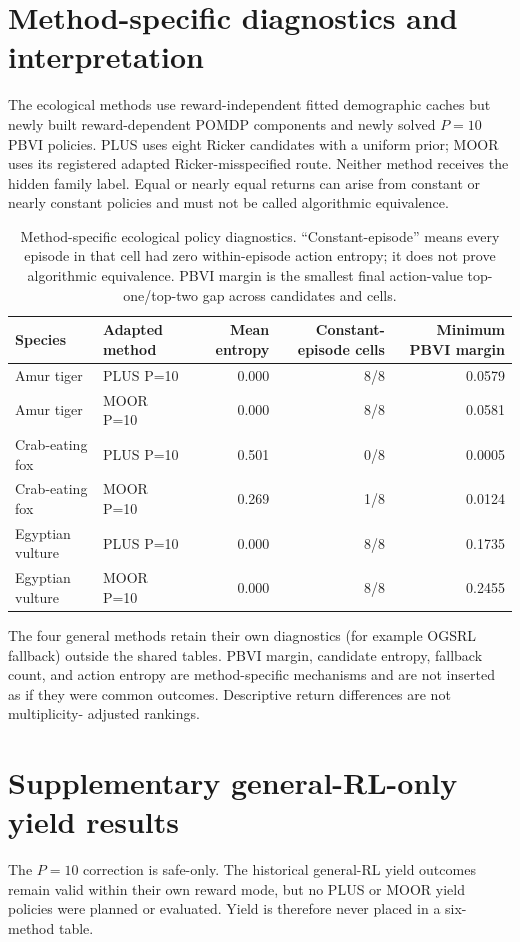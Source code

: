 \documentclass[10pt]{article}
\begin{document}
\section{Method-specific diagnostics and interpretation}
The ecological methods use reward-independent fitted demographic caches but newly
built reward-dependent POMDP components and newly solved \(P=10\) PBVI policies.
PLUS uses eight Ricker candidates with a uniform prior; MOOR uses its registered
adapted Ricker-misspecified route.  Neither method receives the hidden family
label.  Equal or nearly equal returns can arise from constant or nearly constant
policies and must not be called algorithmic equivalence.


\begin{table}[ht]
\centering\small
\begin{tabular}{@{}llrrr@{}}
\toprule
Species & Adapted method & Mean entropy & Constant-episode cells & Minimum PBVI margin \\
\midrule
Amur tiger & PLUS P=10 & 0.000 & 8/8 & 0.0579 \\
Amur tiger & MOOR P=10 & 0.000 & 8/8 & 0.0581 \\
Crab-eating fox & PLUS P=10 & 0.501 & 0/8 & 0.0005 \\
Crab-eating fox & MOOR P=10 & 0.269 & 1/8 & 0.0124 \\
Egyptian vulture & PLUS P=10 & 0.000 & 8/8 & 0.1735 \\
Egyptian vulture & MOOR P=10 & 0.000 & 8/8 & 0.2455 \\
\bottomrule
\end{tabular}
\caption{Method-specific ecological policy diagnostics. ``Constant-episode'' means every episode in that cell had zero within-episode action entropy; it does not prove algorithmic equivalence. PBVI margin is the smallest final action-value top-one/top-two gap across candidates and cells.}
\end{table}


The four general methods retain their own diagnostics (for example OGSRL fallback)
outside the shared tables.  PBVI margin, candidate entropy, fallback count, and
action entropy are method-specific mechanisms and are not inserted as if they
were common outcomes.  Descriptive return differences are not multiplicity-
adjusted rankings.

\section{Supplementary general-RL-only yield results}
The \(P=10\) correction is safe-only.  The historical general-RL yield outcomes
remain valid within their own reward mode, but no PLUS or MOOR yield policies were
planned or evaluated.  Yield is therefore never placed in a six-method table.
\end{document}
